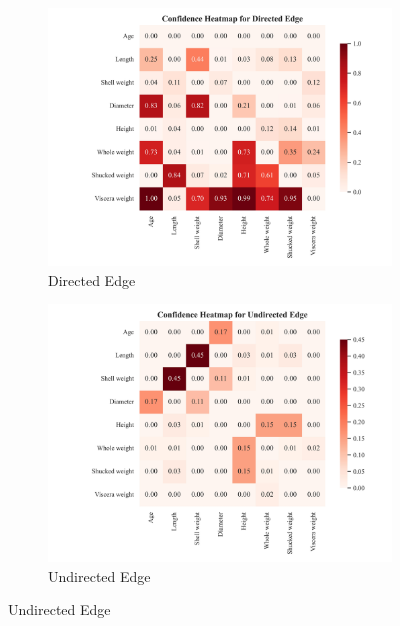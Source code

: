 \documentclass{article}
\begin{document}
\begin{figure}[H]
    \centering

\begin{subfigure}{0.32\textwidth}
        \centering
        \includegraphics[width=\linewidth]{./demo_data/20241104_132155/Abalone/output_graph/certain_edges_confidence_heatmap.jpg}
        \caption{Directed Edge}
    \end{subfigure}
\begin{subfigure}{0.32\textwidth}
        \centering
        \includegraphics[width=\linewidth]{./demo_data/20241104_132155/Abalone/output_graph/uncertain_edges_confidence_heatmap.jpg}
        \caption{Undirected Edge}
    \end{subfigure}

\end{figure}
\end{document}
